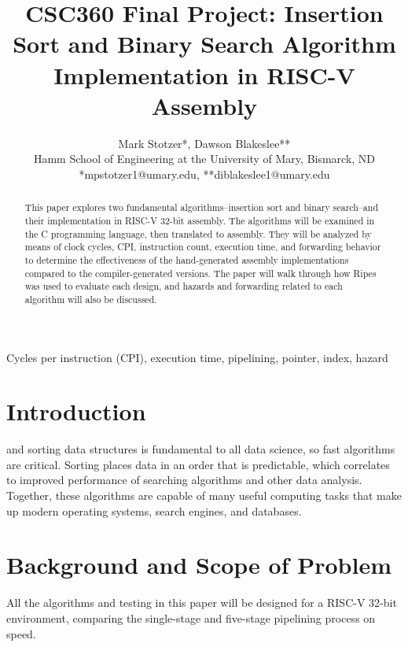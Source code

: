 \documentclass[lettersize,journal]{IEEEtran}
\begin{document}
\title{CSC360 Final Project: Insertion Sort and Binary Search Algorithm Implementation in RISC-V Assembly}

\author{Mark Stotzer*, Dawson Blakeslee** \\ Hamm School of Engineering at the University of Mary, Bismarck, ND \\ *mpstotzer1@umary.edu, **diblakeslee1@umary.edu}

%
{}

\maketitle

\begin{abstract}
This paper explores two fundamental algorithms--insertion sort and binary search--and their implementation in RISC-V 32-bit assembly. The algorithms will be examined in the C programming language, then translated to assembly. They will be analyzed by means of clock cycles, CPI, instruction count, execution time, and forwarding behavior to determine the effectiveness of the hand-generated assembly implementations compared to the compiler-generated versions. The paper will walk through how Ripes was used to evaluate each design, and hazards and forwarding related to each algorithm will also be discussed.
\end{abstract}

\begin{IEEEkeywords}
Cycles per instruction (CPI), execution time, pipelining, pointer, index, hazard
\end{IEEEkeywords}

\section{Introduction}
 and sorting data structures is fundamental to all data science, so fast algorithms are critical. Sorting places data in an order that is predictable, which correlates to improved performance of searching algorithms and other data analysis. Together, these algorithms are capable of many useful computing tasks that make up modern operating systems, search engines, and databases.
    
\section{Background and Scope of Problem}
    All the algorithms and testing in this paper will be designed for a RISC-V 32-bit environment, comparing the single-stage and five-stage pipelining process on speed.
 
\end{document}
